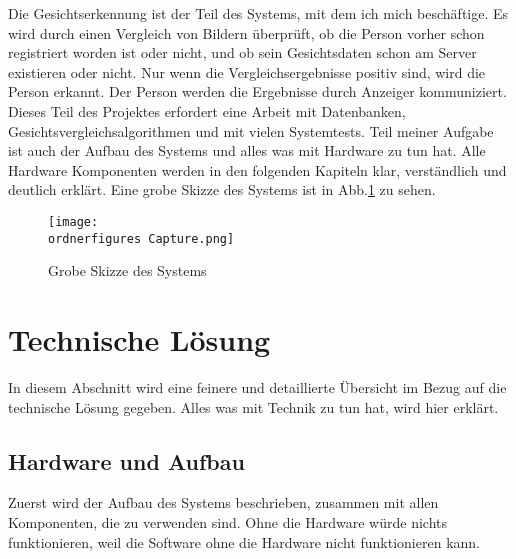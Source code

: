 Die Gesichtserkennung ist der Teil des Systems, mit dem ich mich beschäftige.
Es wird durch einen Vergleich von Bildern überprüft, ob die Person vorher schon registriert worden ist oder nicht, und ob sein Gesichtsdaten schon am Server existieren oder nicht. Nur wenn die Vergleichsergebnisse positiv sind, wird die Person erkannt.
Der Person werden die Ergebnisse durch Anzeiger kommuniziert. Dieses Teil des Projektes erfordert eine Arbeit mit Datenbanken, Gesichtsvergleichsalgorithmen und mit vielen Systemtests. Teil meiner Aufgabe ist auch der Aufbau des Systems und alles was mit Hardware zu tun hat. Alle Hardware Komponenten werden in den folgenden Kapiteln klar, verständlich und deutlich erklärt. Eine grobe Skizze des Systems ist in Abb.\ref{fig:grobe_Skizze} zu sehen.
\begin{figure}[H]
	\texttt{[image: \\ordnerfigures Capture.png]}
	\caption{Grobe Skizze des Systems}
	\label{fig:grobe_Skizze}
\end{figure}
\section{Technische Lösung}
In diesem Abschnitt wird eine feinere und detaillierte Übersicht im Bezug auf die technische Lösung gegeben. Alles was mit Technik zu tun hat, wird hier erklärt.
\subsection{Hardware und Aufbau}
Zuerst wird der Aufbau des Systems beschrieben, zusammen mit allen Komponenten, die zu verwenden sind. Ohne die Hardware würde nichts funktionieren, weil die Software ohne die Hardware nicht funktionieren kann.
